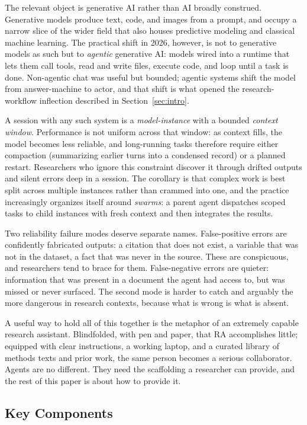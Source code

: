 \documentclass[11pt]{article}
\begin{document}
The relevant object is generative AI rather than AI broadly construed. Generative models produce text, code, and images from a prompt, and occupy a narrow slice of the wider field that also houses predictive modeling and classical machine learning. The practical shift in 2026, however, is not to generative models as such but to \emph{agentic} generative AI: models wired into a runtime that lets them call tools, read and write files, execute code, and loop until a task is done. Non-agentic chat was useful but bounded; agentic systems shift the model from answer-machine to actor, and that shift is what opened the research-workflow inflection described in Section~\ref{sec:intro}.

A session with any such system is a \emph{model-instance} with a bounded \emph{context window}. Performance is not uniform across that window: as context fills, the model becomes less reliable, and long-running tasks therefore require either compaction (summarizing earlier turns into a condensed record) or a planned restart. Researchers who ignore this constraint discover it through drifted outputs and silent errors deep in a session. The corollary is that complex work is best split across multiple instances rather than crammed into one, and the practice increasingly organizes itself around \emph{swarms}: a parent agent dispatches scoped tasks to child instances with fresh context and then integrates the results.

Two reliability failure modes deserve separate names. False-positive errors are confidently fabricated outputs: a citation that does not exist, a variable that was not in the dataset, a fact that was never in the source. These are conspicuous, and researchers tend to brace for them. False-negative errors are quieter: information that was present in a document the agent had access to, but was missed or never surfaced. The second mode is harder to catch and arguably the more dangerous in research contexts, because what is wrong is what is absent.

A useful way to hold all of this together is the metaphor of an extremely capable research assistant. Blindfolded, with pen and paper, that RA accomplishes little; equipped with clear instructions, a working laptop, and a curated library of methods texts and prior work, the same person becomes a serious collaborator. Agents are no different. They need the scaffolding a researcher can provide, and the rest of this paper is about how to provide it.

\subsection{Key Components}
\label{sec:vocab-components}
\end{document}

